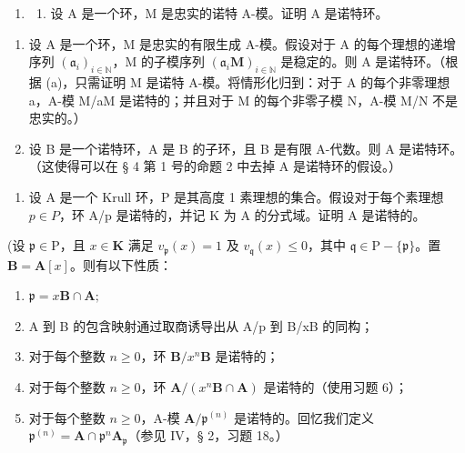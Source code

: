 \begin{enumerate}
\def\labelenumi{\arabic{enumi})}
\setcounter{enumi}{5}
\tightlist
\item
  \begin{enumerate}
  \def\labelenumii{\alph{enumii})}
  \tightlist
  \item
    设 A 是一个环，M 是忠实的诺特 A-模。证明 A 是诺特环。
  \end{enumerate}
\end{enumerate}

\begin{enumerate}
\def\labelenumi{\alph{enumi})}
\setcounter{enumi}{1}
\item
  设 A 是一个环，M 是忠实的有限生成 A-模。假设对于 A 的每个理想的递增序列 \((\mathfrak{a}_{i})_{i\in\mathbb{N}}\)，M 的子模序列 \((\mathfrak{a}_{i}\mathbf{M})_{i\in\mathbb{N}}\) 是稳定的。则 A 是诺特环。（根据 (a)，只需证明 M 是诺特 A-模。将情形化归到：对于 A 的每个非零理想 a，A-模 M/aM 是诺特的；并且对于 M 的每个非零子模 N，A-模 M/N 不是忠实的。）
\item
  设 B 是一个诺特环，A 是 B 的子环，且 B 是有限 A-代数。则 A 是诺特环。（这使得可以在 § 4 第 1 号的命题 2 中去掉 A 是诺特环的假设。）
\end{enumerate}

\begin{enumerate}
\def\labelenumi{\arabic{enumi})}
\setcounter{enumi}{6}
\tightlist
\item
  设 A 是一个 Krull 环，P 是其高度 1 素理想的集合。假设对于每个素理想 \(p \in P\)，环 A/p 是诺特的，并记 K 为 A 的分式域。证明 A 是诺特的。
\end{enumerate}

(设 \(\mathfrak{p} \in \mathrm{P}\)，且 \(x \in \mathbf{K}\) 满足 \(v_{\mathfrak{p}}(x) = 1\) 及 \(v_{\mathfrak{q}}(x) \leqslant 0\)，其中 \(\mathfrak{q} \in \mathrm{P} - \{\mathfrak{p}\}\)。置 \(\mathbf{B} = \mathbf{A}[x]\)。则有以下性质：

\begin{enumerate}
\def\labelenumi{(\roman{enumi})}
\item
  \(\mathfrak{p} = x\mathbf{B}\cap \mathbf{A};\)
\item
  A 到 B 的包含映射通过取商诱导出从 A/p 到 B/xB 的同构；
\item
  对于每个整数 \(n \geqslant 0\)，环 \(\mathbf{B}/x^{n}\mathbf{B}\) 是诺特的；
\item
  对于每个整数 \(n \geqslant 0\)，环 \(\mathbf{A}/(x^n\mathbf{B} \cap \mathbf{A})\) 是诺特的（使用习题 6）；
\item
  对于每个整数 \(n \geqslant 0\)，A-模 \(\mathbf{A}/\mathfrak{p}^{(n)}\) 是诺特的。回忆我们定义 \(\mathfrak{p}^{(n)} = \mathbf{A} \cap \mathfrak{p}^n\mathbf{A}_{\mathfrak{p}}\)（参见 IV，§ 2，习题 18。）
\end{enumerate}

